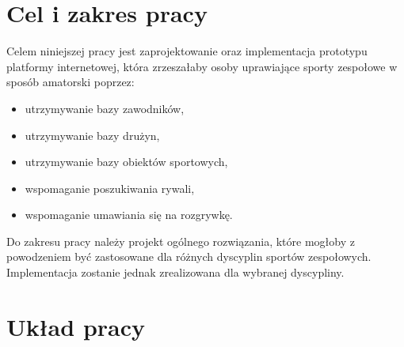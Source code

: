 \section{Cel i zakres pracy}

Celem niniejszej pracy jest zaprojektowanie oraz implementacja prototypu platformy internetowej, która zrzeszałaby osoby uprawiające sporty zespołowe w sposób amatorski poprzez:

\begin{itemize}
  \item utrzymywanie bazy zawodników,
  \item utrzymywanie bazy drużyn,
  \item utrzymywanie bazy obiektów sportowych,
  \item wspomaganie poszukiwania rywali,
  \item wspomaganie umawiania się na rozgrywkę.
\end{itemize} 

Do zakresu pracy należy projekt ogólnego rozwiązania, które mogłoby z powodzeniem być zastosowane dla różnych dyscyplin sportów zespołowych. Implementacja zostanie jednak zrealizowana dla wybranej dyscypliny.

\begin{comment}


Jako dyscyplina została wybrana koszykówka 3 na 3, która jest młodą . Projektowany system został nazwany Team Challenge. Nazwa ta nawiązuje do głównej funkcjonalności systemu jaką jest rzucanie wyzwań. "Team" odnosi się do głównej grupy docelowej systemu czyli drużyn. "Challenge" nawiązuje do funkcjonalności rzucania wyzwań. I coś że rózne formy wyzwań są popularne. IceBucket Challenge itp. I że może budzić z tego powodu zainteresowanie.

Projektowany system został nazwany Team Challenge. 

Ze względu na duży rozwój

TODO O tym że projekt ogólny a implementacja dla wybranej dziedziny a konkretnie koszykówki 3 na 3 która budzi co raz większe zainteresowanie i np będzie na igrzyskach olimpijskich. Wybór ze względu na popularność dyscypliny i brak dla niej istniejącego rozwiązania\cite{JS07}).
\end{comment}


\section{Układ pracy}

\begin{comment}
W kolejnym rozdziale niniejszej pracy przedstawiono wybrane z istniejących platform (?). W trzecim rozdziale zawarto koncept rozwiązania. Czwarty rozdział obejmuje projekt systemu. Piąty rozdział przybliża architekturę systemu oraz technologie wybrane do jego budowy. W następnym, szóstym, rozdziale

O układzie pracy, przejście od przeglądu rozwiązań poprzez koncept, projekt techniczny aż do szczegółów implementacji oraz jej walidacji środowiskowej.

\end{comment}


